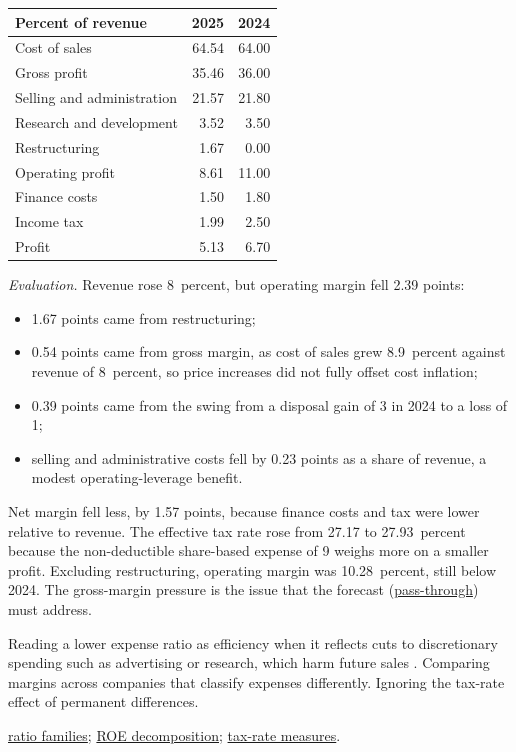 \begin{qfmethod}
\begin{center}\small
\begin{tabular}{@{}lrr@{}}
\toprule
Percent of revenue & 2025 & 2024\\
\midrule
Cost of sales & 64.54 & 64.00\\
Gross profit & 35.46 & 36.00\\
Selling and administration & 21.57 & 21.80\\
Research and development & 3.52 & 3.50\\
Restructuring & 1.67 & 0.00\\
Operating profit & 8.61 & 11.00\\
Finance costs & 1.50 & 1.80\\
Income tax & 1.99 & 2.50\\
Profit & 5.13 & 6.70\\
\bottomrule
\end{tabular}
\end{center}

\emph{Evaluation.} Revenue rose 8~percent, but operating margin fell 2.39 points:
\begin{itemize}
\item 1.67 points came from restructuring;
\item 0.54 points came from gross margin, as cost of sales grew 8.9~percent against revenue of 8~percent, so price increases did not fully offset cost inflation;
\item 0.39 points came from the swing from a disposal gain of 3 in 2024 to a loss of 1;
\item selling and administrative costs fell by 0.23 points as a share of revenue, a modest operating-leverage benefit.
\end{itemize}
Net margin fell less, by 1.57 points, because finance costs and tax were lower relative to revenue.
The effective tax rate rose from 27.17 to 27.93~percent because the non-deductible share-based expense of 9 weighs more on a smaller profit. Excluding restructuring, operating margin was 10.28~percent, still below 2024. The gross-margin pressure is the issue that the forecast (\hyperref[meth:competition-inflation-forecasting]{pass-through}) must address.

 Reading a lower expense ratio as efficiency when it reflects cuts to discretionary spending such as advertising or research, which harm future sales \citep[p.~35]{financial-statement-analysis-2009}. Comparing margins across companies that classify expenses differently. Ignoring the tax-rate effect of permanent differences.

 \hyperref[meth:financial-ratio-families]{ratio families}; \hyperref[meth:return-on-equity-decomposition]{ROE decomposition}; \hyperref[meth:tax-rate-measures]{tax-rate measures}.

\end{qfmethod}
